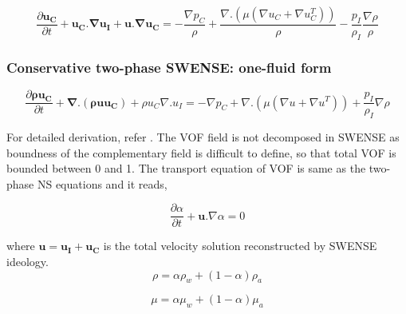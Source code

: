 \documentclass[preprint,12pt]{article}
\begin{document}
{\begin{equation}\label{SWENSE_NCSV}
\frac{\partial \pmb{u_C}}{\partial t}+ \pmb{u_C.\nabla u_I + u. \nabla u_C}= -\frac{\nabla p_C}{\rho} + \frac{\nabla . (\mu (\nabla u_C + \nabla u_C^T))}{\rho}-\frac{p_I}{\rho_I} \frac{\nabla \rho}{\rho}
\end{equation}

\subsubsection*{Conservative two-phase SWENSE: one-fluid form}


\begin{equation}
 \frac{\partial \pmb{\rho u_C}}{\partial t}+\pmb{\nabla.(\rho u u_C)}+\rho u_C \nabla .u_I =-{\nabla p_C} + {\nabla . (\mu (\nabla u + \nabla u^T))}  +\frac{p_I}{\rho_I} {\nabla \rho}  
\end{equation}

For detailed derivation, refer \cite{zhaobin_progress}. The VOF field is not decomposed in SWENSE as boundness of the complementary field is difficult to define, so that total VOF is bounded between 0 and 1. The transport equation of VOF is same as the two-phase NS equations and it reads, 

\begin{equation} \label{SWENSE_VOF}
\frac{\partial \alpha}{\partial t}+ \pmb{u}. \nabla \alpha = 0
\end{equation}

where $\pmb{u=u_I+u_C}$ is the total velocity solution reconstructed by SWENSE ideology.  
\begin{equation}
\rho =\alpha \rho_w+(1-\alpha) \rho_a
\end{equation}

\begin{equation}
\mu=\alpha\mu_w+ (1-\alpha) \mu_a
\end{equation}

\begin{figure}
\centering

\begin{center}
\begin{adjustbox}{width=1.5\textwidth,height=17cm,keepaspectratio}
\end{adjustbox}
\end{center}
\end{figure}}
\end{document}
